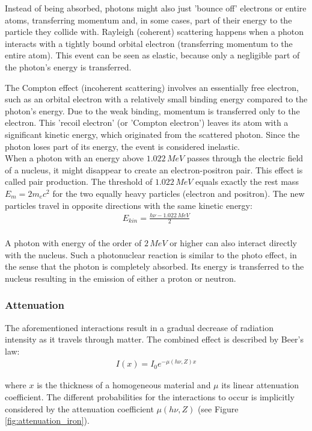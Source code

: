Instead of being absorbed, photons might also just 'bounce off' electrons or entire atoms, transferring momentum and, in some cases, part of their energy to the particle they collide with.
Rayleigh (coherent) scattering happens when a photon interacts with a tightly bound orbital electron (transferring momentum to the entire atom).
This event can be seen as elastic, because only a negligible part of the photon's energy is transferred.

The Compton effect (incoherent scattering) involves an essentially free electron, such as an orbital electron with a relatively small binding energy compared to the photon's energy.
Due to the weak binding, momentum is transferred only to the electron.
This 'recoil electron' (or 'Compton electron') leaves its atom with a significant kinetic energy, which originated from the scattered photon.
Since the photon loses part of its energy, the event is considered inelastic. \\

When a photon with an energy above $1.022 \, MeV$ passes through the electric field of a nucleus, it might disappear to create an electron-positron pair.
This effect is called pair production.
The threshold of $1.022 \, MeV$ equals exactly the rest mass $E_m = 2m_ec^2$ for the two equally heavy particles (electron and positron).
The new particles travel in opposite directions with the same kinetic energy:
\begin{align}
 E_{kin} = \frac{h\nu - 1.022 \, MeV}{2}
\end{align} \\

A photon with energy of the order of $2 \, MeV$ or higher can also interact directly with the nucleus.
Such a photonuclear reaction is similar to the photo effect, in the sense that the photon is completely absorbed.
Its energy is transferred to the nucleus resulting in the emission of either a proton or neutron.

\subsubsection{Attenuation}
The aforementioned interactions result in a gradual decrease of radiation intensity as it travels through matter.
The combined effect is described by Beer's law:
\begin{align}
I(x) = I_0 e^{-\mu(h\nu,Z)x}
\end{align}

where $x$ is the thickness of a homogeneous material and $\mu$ its linear attenuation coefficient.
The different probabilities for the interactions to occur is implicitly considered by the attenuation coefficient $\mu(h\nu,Z)$ (see Figure \ref{fig:attenuation_iron}).

